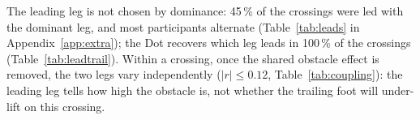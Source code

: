 The leading leg is not chosen by dominance: 45\,\% of the crossings were led with the dominant leg, and most participants
alternate (Table~\ref{tab:leads} in Appendix~\ref{app:extra}); the Dot recovers which leg leads in 100\,\% of the crossings
(Table~\ref{tab:leadtrail}). Within a crossing, once the shared obstacle effect is removed, the two legs vary independently
($\lvert r\rvert \leq 0.12$, Table~\ref{tab:coupling}): the leading leg tells how high the obstacle is, not whether the trailing
foot will under-lift on this crossing.

\begin{table}[htbp]
\centering
\caption{Coupling of the two legs: correlation of the crossing-to-crossing deviations from each participant $\times$ obstacle mean.}
\label{tab:coupling}

\end{table}


